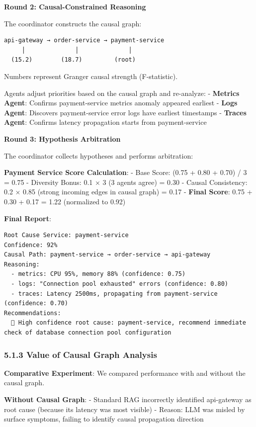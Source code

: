 \textbf{Round 2: Causal-Constrained Reasoning}

The coordinator constructs the causal graph:

\begin{verbatim}
api-gateway → order-service → payment-service
     │              │              │
  (15.2)        (18.7)         (root)
\end{verbatim}

Numbers represent Granger causal strength (F-statistic).

Agents adjust priorities based on the causal graph and re-analyze: -
\textbf{Metrics Agent}: Confirms payment-service metrics anomaly
appeared earliest - \textbf{Logs Agent}: Discovers payment-service error
logs have earliest timestamps - \textbf{Traces Agent}: Confirms latency
propagation starts from payment-service

\textbf{Round 3: Hypothesis Arbitration}

The coordinator collects hypotheses and performs arbitration:

\textbf{Payment Service Score Calculation}: - Base Score: (0.75 + 0.80 +
0.70) / 3 = 0.75 - Diversity Bonus: 0.1 × 3 (3 agents agree) = 0.30 -
Causal Consistency: 0.2 × 0.85 (strong incoming edges in causal graph) =
0.17 - \textbf{Final Score}: 0.75 + 0.30 + 0.17 = 1.22 (normalized to
0.92)

\textbf{Final Report}:

\begin{verbatim}
Root Cause Service: payment-service
Confidence: 92%
Causal Path: payment-service → order-service → api-gateway
Reasoning:
  - metrics: CPU 95%, memory 88% (confidence: 0.75)
  - logs: "Connection pool exhausted" errors (confidence: 0.80)
  - traces: Latency 2500ms, propagating from payment-service (confidence: 0.70)
Recommendations:
  🔴 High confidence root cause: payment-service, recommend immediate check of database connection pool configuration
\end{verbatim}

\hypertarget{value-of-causal-graph-analysis}{%
\subsubsection{5.1.3 Value of Causal Graph
Analysis}\label{value-of-causal-graph-analysis}}

\textbf{Comparative Experiment}: We compared performance with and
without the causal graph.

\textbf{Without Causal Graph}: - Standard RAG incorrectly identified
api-gateway as root cause (because its latency was most visible) -
Reason: LLM was misled by surface symptoms, failing to identify causal
propagation direction

